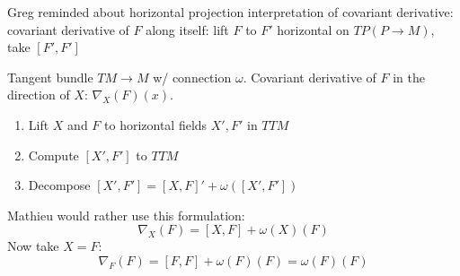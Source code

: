\documentclass[12pt,fleqn]{article}
\begin{document}
Greg reminded about horizontal projection interpretation of covariant derivative: covariant derivative of \( F \) along itself: lift \( F \) to \( F' \) horizontal on \( TP (P\to M) \), take \( [F', F'] \)

Tangent bundle \( TM\to M \) w/ connection \( \omega \). Covariant derivative of \( F \) in the direction of \( X \): \( \nabla_X(F)(x) \). 
\begin{enumerate}
\item Lift \( X \) and \( F \) to horizontal fields \( X', F' \) in \( TTM \)
\item Compute \( [X', F'] \) to \( TTM \)
\item Decompose \( [X', F'] = [X, F]' + \omega([X', F']) \)
\end{enumerate}

Mathieu would rather use this formulation:
\[ 
\nabla_X(F) = [X, F] + \omega(X)(F) 
\]
Now take \( X=F \):
\[ 
\nabla_F(F) = [F, F] + \omega(F)(F) = \omega(F)(F) 
\]

\clearpage

\clearpage

\clearpage

\clearpage

\clearpage

\clearpage
% 


\end{document}
